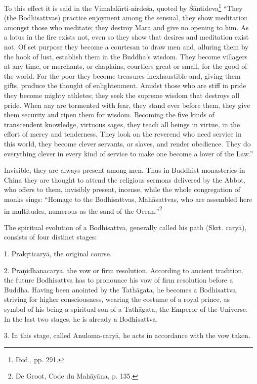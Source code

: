 \documentclass[a4paper, 12pt, oneside]{article}
\begin{document}
To this effect it is said in the Vimalak\={\i}rti-nirde\'{s}a, quoted by \'{S}\={a}ntideva\footnote{Ibid., pp. 291.} ``They (the Bodhisattvas) practice enjoyment among the sensual, they show meditation amongst those who meditate; they destroy M\={a}ra and give no opening to him. As a lotus in the fire exists not, even so they show that desires and meditation exist not. Of set purpose they become a courtesan to draw men and, alluring them by the hook of lust, establish them in the Buddha's wisdom. They become villagers at any time, or merchants, or chaplains, courtiers great or small, for the good of the world. For the poor they become treasures inexhaustible and, giving them gifts, produce the thought of enlightenment. Amidst those who are stiff in pride they become mighty athletes; they seek the supreme wisdom that destroys all pride. When any are tormented with fear, they stand ever before them, they give them security and ripen them for wisdom. Becoming the five kinds of transcendent knowledge, virtuous sages, they teach all beings in virtue, in the effort of mercy and tenderness. They look on the reverend who need service in this world, they become clever servants, or slaves, and render obedience. They do everything clever in every kind of service to make one become a lover of the Law.''

Invisible, they are always present among men. Thus in Buddhist monasteries in China they are thought to attend the religious sermons delivered by the Abbot, who offers to them, invisibly present, incense, while the whole congregation of monks sings: ``Homage to the Bodhisattvas, Mah\={a}sattvas, who are assembled here in multitudes, numerous as the sand of the Ocean.''\footnote{De Groot, Code du Mah\={a}y\={a}na, p. 135.}

The spiritual evolution of a Bodhisattva, generally called his path (Skrt. cary\={a}), consists of four distinct stages:

1. Prak\d{r}ticary\={a}, the original course.

2. Pra\d{n}idh\={a}nacary\={a}, the vow or firm resolution. According to ancient tradition, the future Bodhisattva has to pronounce his vow of firm resolution before a Buddha. Having been anointed by the Tath\={a}gata, he becomes a Bodhisattva, striving for higher consciousness, wearing the costume of a royal prince, as symbol of his being a spiritual son of a Tath\={a}gata, the Emperor of the Universe. In the last two stages, he is already a Bodhisattva.

3. In this stage, called Anuloma-cary\={a}, he acts in accordance with the vow taken.
\end{document}
